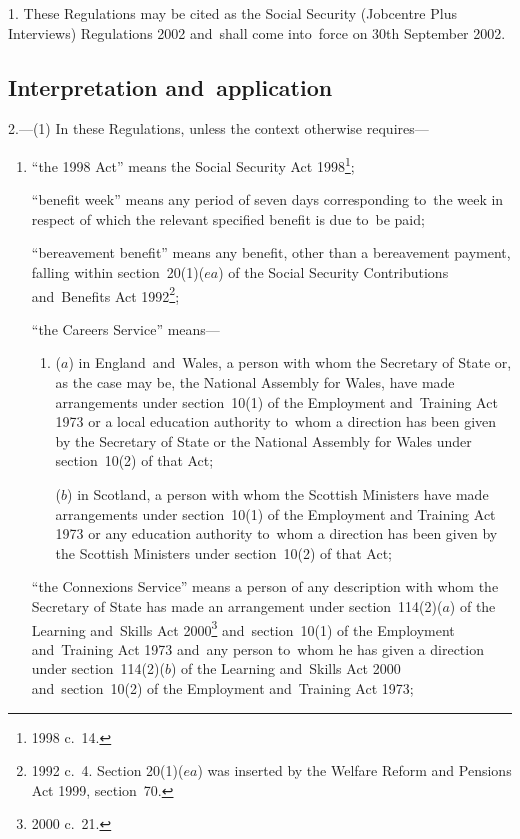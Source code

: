 \documentclass[12pt,a4paper]{article}
\begin{document}
1.  These Regulations may be cited as the Social Security (Jobcentre Plus Interviews) Regulations 2002 and~shall come into~force on 30th September 2002.

\subsection[2. Interpretation and~application]{Interpretation and~application}

2.---(1)  In these Regulations, unless the context otherwise requires—
\begin{enumerate}\item[]
“the 1998 Act” means the Social Security Act 1998\footnote{1998 c.~14.};

“benefit week” means any period of seven days corresponding to~the week in respect of which the relevant specified benefit is due to~be paid;

“bereavement benefit” means any benefit, other than a bereavement payment, falling within section~20(1)($ea$)  of the Social Security Contributions and~Benefits Act 1992\footnote{1992 c.~4. Section 20(1)($ea$)  was inserted by the Welfare Reform and Pensions Act 1999, section~70.};

“the Careers Service” means—
\begin{enumerate}\item[]
($a$) 
in England~and~Wales, a person with whom the Secretary of State or, as the case may be, the National Assembly for Wales, have made arrangements under section~10(1) of the Employment and~Training Act 1973 or a local education authority to~whom a direction has been given by the Secretary of State or the National Assembly for Wales under section~10(2) of that Act;

($b$) 
in Scotland, a person with whom the Scottish Ministers have made arrangements under section~10(1) of the Employment and Training Act 1973 or any education authority to~whom a direction has been given by the Scottish Ministers under section~10(2) of that Act;
\end{enumerate}

“the Connexions Service” means a person of any description with whom the Secretary of State has made an arrangement under section~114(2)($a$)  of the Learning and~Skills Act 2000\footnote{2000 c.~21.} and~section~10(1) of the Employment and~Training Act 1973 and~any person to~whom he has given a direction under section~114(2)($b$)  of the Learning and~Skills Act 2000 and~section~10(2) of the Employment and~Training Act 1973;


\end{enumerate}
\end{document}

